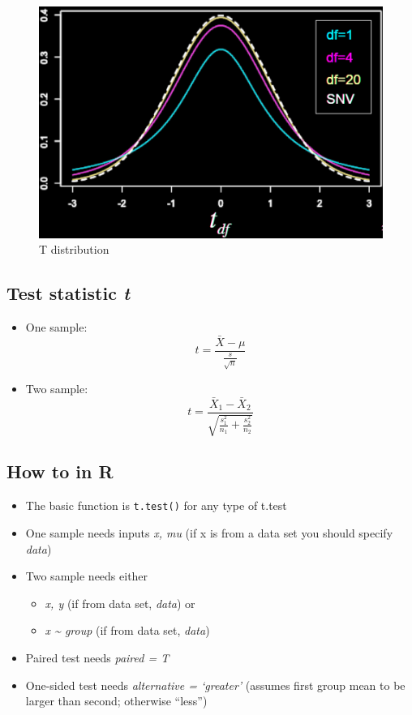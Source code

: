 \documentclass[
]{book}
\providecommand{\tightlist}{%
  \setlength{\itemsep}{0pt}\setlength{\parskip}{0pt}}
\begin{document}
\begin{figure}
\centering
\includegraphics{./img/tdist.png}
\caption{T distribution}
\end{figure}

\subsection{\texorpdfstring{Test statistic \emph{t}}{Test statistic t}}\label{test-statistic-t-1}

\begin{itemize}
\item
  One sample: \[ t = \frac{\bar{X} - \mu}{\frac{s}{\sqrt{n}}} \]
\item
  Two sample: \[t = \frac{\bar{X}_1 - \bar{X}_2}{\sqrt{\frac{s_1^2}{n_1} + \frac{s_2^2}{n_2}}} \]
\end{itemize}

\subsection{How to in R}\label{how-to-in-r-1}

\begin{itemize}
\tightlist
\item
  The basic function is \texttt{t.test()} for any type of t.test
\item
  One sample needs inputs \emph{x, mu} (if x is from a data set you should specify \emph{data})
\item
  Two sample needs either

  \begin{itemize}
  \tightlist
  \item
    \emph{x, y} (if from data set, \emph{data}) or
  \item
    \emph{x \textasciitilde{} group} (if from data set, \emph{data})
  \end{itemize}
\item
  Paired test needs \emph{paired = T}
\item
  One-sided test needs \emph{alternative = `greater'} (assumes first group mean to be larger than second; otherwise ``less'')
\end{itemize}
\end{document}
